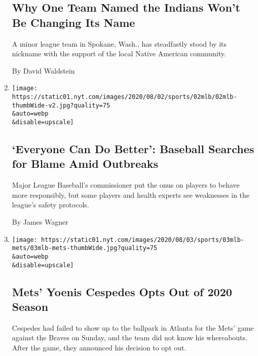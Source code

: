 \begin{enumerate}
  \hypertarget{why-one-team-named-the-indians-wont-be-changing-its-name}{%
  \subsection{Why One Team Named the Indians Won't Be Changing Its
  Name}\label{why-one-team-named-the-indians-wont-be-changing-its-name}}

  A minor league team in Spokane, Wash., has steadfastly stood by its
  nickname with the support of the local Native American community.

  By David Waldstein
\item
  \href{/2020/08/02/sports/baseball/mlb-coronavirus-outbreaks.html}{}

  \texttt{[image: https://static01.nyt.com/images/2020/08/02/sports/02mlb/02mlb-thumbWide-v2.jpg?quality=75\\\&auto=webp\\\&disable=upscale]}

  \hypertarget{everyone-can-do-better-baseball-searches-for-blame-amid-outbreaks}{%
  \subsection{`Everyone Can Do Better': Baseball Searches for Blame Amid
  Outbreaks}\label{everyone-can-do-better-baseball-searches-for-blame-amid-outbreaks}}

  Major League Baseball's commissioner put the onus on players to behave
  more responsibly, but some players and health experts see weaknesses
  in the league's safety protocols.

  By James Wagner
\item
  \href{/2020/08/02/sports/baseball/Yoenis-cespedes-opt-out-rule.html}{}

  \texttt{[image: https://static01.nyt.com/images/2020/08/03/sports/03mlb-mets/03mlb-mets-thumbWide.jpg?quality=75\\\&auto=webp\\\&disable=upscale]}

  \hypertarget{mets-yoenis-cespedes-opts-out-of-2020-season}{%
  \subsection{Mets' Yoenis Cespedes Opts Out of 2020
  Season}\label{mets-yoenis-cespedes-opts-out-of-2020-season}}

  Cespedes had failed to show up to the ballpark in Atlanta for the
  Mets' game against the Braves on Sunday, and the team did not know his
  whereabouts. After the game, they announced his decision to opt out.


\end{enumerate}
